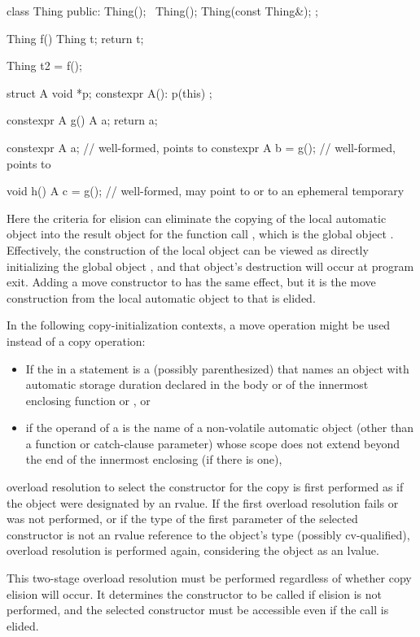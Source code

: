 \pnum
\begin{example}
\begin{codeblock}
class Thing {
public:
  Thing();
  ~Thing();
  Thing(const Thing&);
};

Thing f() {
  Thing t;
  return t;
}

Thing t2 = f();

struct A {
  void *p;
  constexpr A(): p(this) {}
};

constexpr A g() {
  A a;
  return a;
}

constexpr A a;          // well-formed,  points to 
constexpr A b = g();    // well-formed,  points to 

void h() {
  A c = g();            // well-formed,  may point to  or to an ephemeral temporary
}
\end{codeblock}
Here the criteria for elision can
eliminate
the copying of the local automatic object
into the result object for the function call
,
which is the global object
.
Effectively, the construction of the local object
can be viewed as directly initializing the global
object
,
and that object's destruction will occur at program
exit.
Adding a move constructor to  has the same effect, but it is the
move construction from the local automatic object to  that is elided.
\end{example}

\pnum
In the following copy-initialization contexts, a move operation might be used instead of a copy operation:
\begin{itemize}
\item If the  in a  statement
is a (possibly parenthesized) 
that names an object with automatic storage duration declared in the body
or  of the innermost enclosing
function or , or

\item if the operand of a 
is the name of a non-volatile automatic object
(other than a function or catch-clause parameter)
whose scope does not extend beyond the end of the innermost enclosing
 (if there is one),
\end{itemize}
overload resolution to select the constructor
for the copy is first performed as if the object were designated by an
rvalue.
If the first overload resolution fails or was not performed,
or if the type of the first parameter of the selected
constructor is not an rvalue reference to the object's type (possibly cv-qualified),
overload resolution is performed again, considering the object as an lvalue.
\begin{note}
This two-stage overload resolution must be performed regardless
of whether copy elision will occur. It determines the constructor to be called if
elision is not performed, and the selected constructor must be accessible even if
the call is elided.
\end{note}

